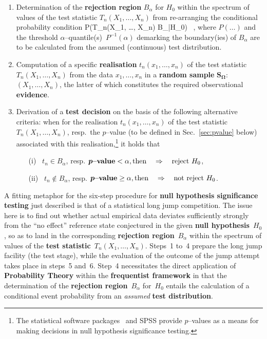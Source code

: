 \begin{enumerate}
\item Determination of the \textbf{rejection region}
$B_{\alpha}$ for $H_{0}$ within the spectrum of values of 
the test statistic $T_{n}(X_{1},\ldots, X_{n})$ from re-arranging 
the conditional probability condition
%
\be
P\left(T_{n}(X_{1}, \ldots, X_{n}) \in B_{\alpha}|H_{0}\right)
\stackrel{!}{\leq} \alpha \ ,
\ee
%
where $P(\ldots)$ and the threshold
$\alpha$--quantile(s)~$P^{-1}(\alpha)$ demarking the boundary(ies)
of $B_{\alpha}$ are to be calculated from the assumed (continuous)
test distribution.

\item Computation of a specific \textbf{realisation}
$t_{n}(x_{1}, \ldots, x_{n})$ of the test statistic
$T_{n}(X_{1}, \ldots, X_{n})$ from the data $x_{1}, 
\ldots, x_{n}$ in a \textbf{random sample} 
$\boldsymbol{S_{\Omega}}$:~$(X_{1}, \ldots, X_{n})$, the latter of 
which constitutes the required observational
\textbf{evidence}.%

\item Derivation of a \textbf{test decision} on the basis of the 
following alternative criteria: when for the realisation 
$t_{n}(x_{1}, \ldots, x_{n})$ of the test statistic $T_{n}(X_{1}, 
\ldots, X_{n})$, resp.~the $p$--value (to be defined in 
Sec.~\ref{sec:pvalue} below) associated with this 
realisation,\footnote{The statistical software packages \R{}\ and
SPSS provide $p$--values as a means for making decisions in null
hypothesis significance testing.} it holds that%
%
\begin{itemize}
\item[(i)]\ $t_{n} \in B_{\alpha}$, resp.
$\boldsymbol{p}\text{{\bf--value}} < \alpha, \text{then}
\quad\Rightarrow\quad
\text{reject}~H_{0}$,\\[-5mm]
\item[(ii)]\ $t_{n} \notin B_{\alpha}$, resp.
$\boldsymbol{p}\text{{\bf--value}} \geq \alpha, \text{then}
\quad\Rightarrow\quad\text{not\ reject}~H_{0}$.%
\end{itemize}
%
\end{enumerate}
%

\medskip
\noindent
A fitting metaphor for the six-step procedure for \textbf{null
hypothesis significance testing} just described is that of a
statistical long jump competition. The issue here is to find out
whether actual empirical data deviates sufficiently strongly from
the ``no effect'' reference state conjectured in the
given \textbf{null hypothesis}~$H_{0}$, so as to land in the 
corresponding \textbf{rejection region}~$B_{\alpha}$ within the 
spectrum of values of the \textbf{test 
statistic}~$T_{n}(X_{1}, \ldots, X_{n})$. Steps~1 to~4 prepare the 
long jump facility (the test stage), while the evaluation of the 
outcome of the jump attempt takes place in steps~5 and~6. Step~4 
necessitates the direct application of \textbf{Probability Theory}
within the \textbf{frequentist framework} in that the determination
of the \textbf{rejection region}~$B_{\alpha}$ for~$H_{0}$ entails
the calculation of a conditional event probability from an
\textit{assumed} \textbf{test distribution}.

